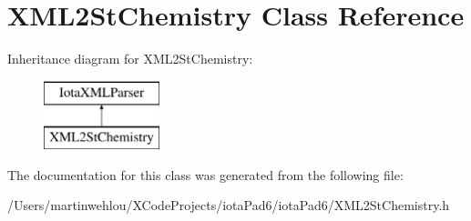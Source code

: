 \hypertarget{interface_x_m_l2_st_chemistry}{
\section{XML2StChemistry Class Reference}
\label{interface_x_m_l2_st_chemistry}
}
Inheritance diagram for XML2StChemistry:\begin{figure}[H]
\begin{center}
\leavevmode
\includegraphics[height=2.000000cm]{interface_x_m_l2_st_chemistry}
\end{center}
\end{figure}


The documentation for this class was generated from the following file:\begin{DoxyCompactItemize}
\item 
/Users/martinwehlou/XCodeProjects/iotaPad6/iotaPad6/XML2StChemistry.h\end{DoxyCompactItemize}
